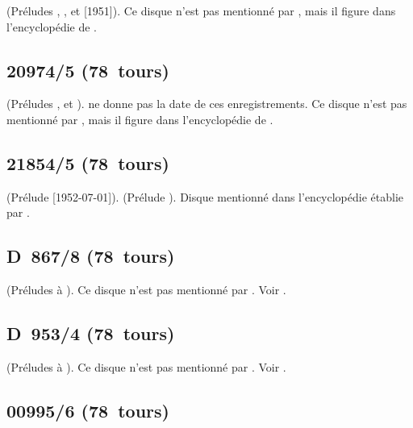 \Scriabine{} (Préludes  ,  , 
 et   [1951]).
Ce disque n'est pas mentionné par \INikonovich{}
\citep[voir][]{Nikonovich11}, mais il figure dans l'encyclopédie de
\citet[supplément~II, p.~203]{CloughCuming}.

\subsection{20974/5 (78~tours)}

\Scriabine{} (Préludes  ,   et
 ).
\EWhite{} \citep[voir][p.~83]{White} ne donne pas la date de ces
enregistrements.
Ce disque n'est pas mentionné par \INikonovich{}
\citep[voir][]{Nikonovich11}, mais il figure dans l'encyclopédie de
\citet[supplément~II, p.~203]{CloughCuming}.

\subsection{21854/5 (78~tours)}

\Glazounov{} (Prélude   [1952-07-01]).
\Scriabine{} (Prélude  ).
Disque mentionné dans l'encyclopédie établie par \citet[supplément~III,
p.~177]{CloughCuming}.

\subsection{D~867/8 (78~tours)}

\Scriabine{} (Préludes   à ).
Ce disque n'est pas mentionné par \INikonovich{}
\citep[voir][]{Nikonovich11}.
Voir \citet{Recordssu}.

\subsection{D~953/4 (78~tours)}

\Chopin{} (Préludes   à ).
Ce disque n'est pas mentionné par \INikonovich{}
\citep[voir][]{Nikonovich11}.
Voir \citet{Recordssu}.

\subsection{00995/6 (78~tours)}

